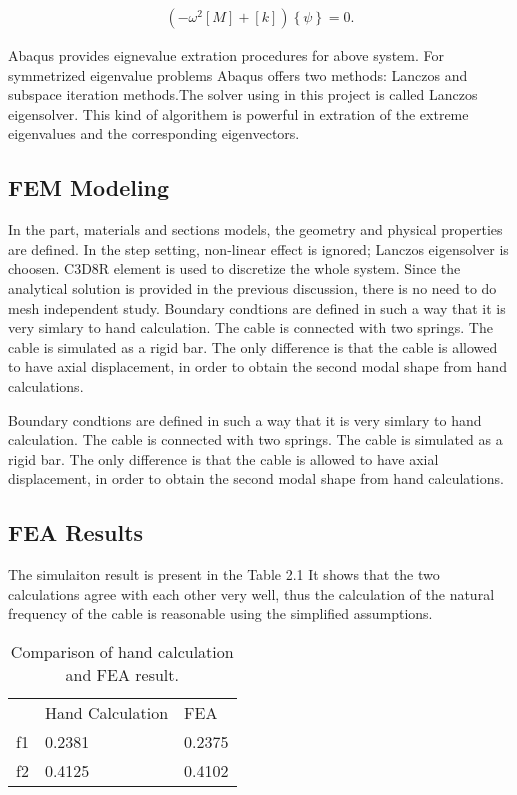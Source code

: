 \documentclass[paper=a4, fontsize=11pt]{scrartcl} %
\numberwithin{equation}{section} %
\numberwithin{figure}{section} %
\numberwithin{table}{section} %
\begin{document}
\begin{align}
\left(-\omega^2\left[M\right]+\left[k\right]\right)\left\{\psi\right\}=0.
\end{align}

Abaqus provides eignevalue extration procedures for above system. For
symmetrized eigenvalue problems Abaqus offers two methods: Lanczos and
subspace iteration methods.The solver using in this project is called
Lanczos eigensolver. This kind of algorithem is powerful in extration
of the extreme eigenvalues and the corresponding eigenvectors.

\subsection{FEM Modeling}
\label{sec:fem-modeling}

In the part, materials and sections models, the geometry and physical
properties are defined. In the step setting, non-linear effect is
ignored; Lanczos eigensolver is choosen. C3D8R element is used to
discretize the whole system. Since the analytical solution is provided
in the previous discussion, there is no need to do mesh independent
study. Boundary condtions are defined in such a way that it is very
simlary to hand calculation. The cable is connected with two springs.
The cable is simulated as a rigid bar. The only difference is that the
cable is allowed to have axial displacement, in order to obtain the
second modal shape from hand calculations.

Boundary condtions are defined in such a way that it is very simlary
to hand calculation. The cable is connected with two springs. The
cable is simulated as a rigid bar. The only difference is that the
cable is allowed to have axial displacement, in order to obtain the
second modal shape from hand calculations.

\subsection{FEA Results}
\label{sec:fea-results}

The simulaiton result is present in the Table 2.1 It shows that the two
calculations agree with each other very well, thus the calculation of
the natural frequency of the cable is reasonable using the simplified
assumptions.

\begin{table}
  \centering
  \begin{tabular}{lll}
    \hline    
   & Hand Calculation &FEA \\
   f1&	0.2381&	0.2375 \\
    f2&	0.4125&	0.4102 \\
    \hline
  \end{tabular}
  \caption{Comparison of hand calculation and FEA result.}
\end{table}
\end{document}
